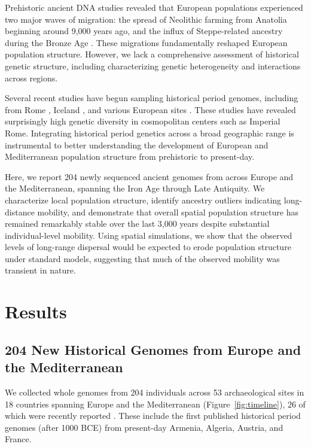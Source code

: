 \documentclass[11pt]{article}
\begin{document}
Prehistoric ancient DNA studies revealed that European populations experienced two major waves of migration: the spread of Neolithic farming from Anatolia beginning around 9,000 years ago, and the influx of Steppe-related ancestry during the Bronze Age \citep{Haak2015,Lazaridis2016,Mathieson2015}. These migrations fundamentally reshaped European population structure. However, we lack a comprehensive assessment of historical genetic structure, including characterizing genetic heterogeneity and interactions across regions.

Several recent studies have begun sampling historical period genomes, including from Rome \citep{Antonio2019,Posth2021}, Iceland \citep{Ebenesersdottir2018}, and various European sites \citep{Fernandes2020,Olalde2019a}. These studies have revealed surprisingly high genetic diversity in cosmopolitan centers such as Imperial Rome. Integrating historical period genetics across a broad geographic range is instrumental to better understanding the development of European and Mediterranean population structure from prehistoric to present-day.

Here, we report 204 newly sequenced ancient genomes from across Europe and the Mediterranean, spanning the Iron Age through Late Antiquity. We characterize local population structure, identify ancestry outliers indicating long-distance mobility, and demonstrate that overall spatial population structure has remained remarkably stable over the last 3,000 years despite substantial individual-level mobility. Using spatial simulations, we show that the observed levels of long-range dispersal would be expected to erode population structure under standard models, suggesting that much of the observed mobility was transient in nature.

\section{Results}

\subsection{204 New Historical Genomes from Europe and the Mediterranean}

We collected whole genomes from 204 individuals across 53 archaeological sites in 18 countries spanning Europe and the Mediterranean (Figure~\ref{fig:timeline}), 26 of which were recently reported \citep{Moots2022}. These include the first published historical period genomes (after 1000 BCE) from present-day Armenia, Algeria, Austria, and France.
\end{document}
